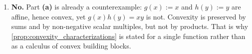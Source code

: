 \begin{exercisesolution}
\begin{enumerate}[label=\textbf{(\alph*)}]
    Note that the \emph{main} diagonal would not have exposed this: from $(0,0)$ to $(\pi,\pi)$
    the midpoint value $0$ sits below the average $1$, consistent with convexity. Choosing the
    direction well is most of the work in these problems, and the indefinite Hessian tells you
    which direction to choose, namely an eigenvector for the negative eigenvalue, here $(1,-1)$.
  \item \textbf{No.} Part \textbf{(a)} is already a counterexample: $g(x) := x$ and
    $h(y) := y$ are affine, hence convex, yet $g(x)h(y) = xy$ is not. Convexity is preserved by
    sums and by non-negative scalar multiples, but not by products. That is why
    \cref{prop:convexity_characterizations} is stated for a single function rather than as a
    calculus of convex building blocks.
\end{enumerate}
\end{exercisesolution}
